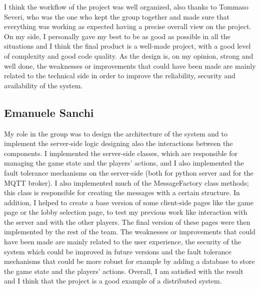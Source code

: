 \documentclass{scrartcl}
\begin{document}
I think the workflow of the project was well organized, also thanks to Tommaso Severi, who
was the one who kept the group together and made sure that everything was working as expected having a precise
overall view on the project. On my side, I personally gave my best to be as good as possible in all the situations
and I think the final product is a well-made project, with a good level of complexity and good code quality. 
As the design is, on my opinion, strong and well done, the weaknesses or improvements that could have been made are
mainly related to the technical side in order to improve the reliability, security and availability of the system.

\subsection{Emanuele Sanchi}\label{emanuele-sanchi}
My role in the group was to design the architecture of the system and to implement the server-side 
logic designing also the interactions between the components. I implemented the server-side classes, 
which are responsible for managing the game state and the players' actions, and I also implemented 
the fault tolerance mechanisms on the server-side (both for python server and for the MQTT broker). 
I also implemented much of the MessageFactory class methods; this class is responsible for creating 
the messages with a certain structure. In addition, I helped to create a base version of some 
client-side pages like the game page or the lobby selection page, to test my previous work like interaction 
with the server and with the other players. The final version of these pages were then implemented by 
the rest of the team. The weaknesses or improvements 
that could have been made are mainly related to the user experience, the security of the system which 
could be improved in future versions and the fault tolerance mechanisms that could be more robust for 
example by adding a database to store the game state and the players' actions. Overall, I am satisfied 
with the result and I think that the project is a good example of a distributed system.
\end{document}
